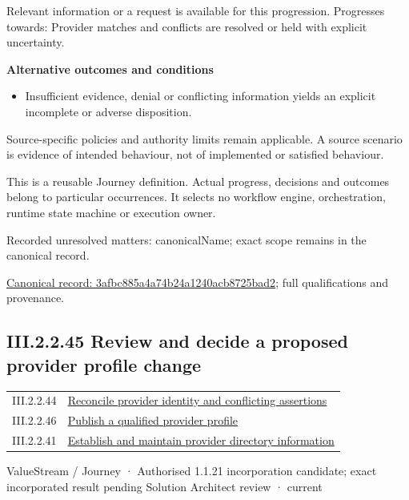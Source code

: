 Relevant information or a request is available for this progression. Progresses towards: Provider matches and conflicts are resolved or held with explicit uncertainty.



\par\medskip\textbf{Alternative outcomes and conditions}\par


\begin{itemize}


\item Insufficient evidence, denial or conflicting information yields an explicit incomplete or adverse disposition.

\end{itemize}


Source-specific policies and authority limits remain applicable. A source scenario is evidence of intended behaviour, not of implemented or satisfied behaviour.



This is a reusable Journey definition. Actual progress, decisions and outcomes belong to particular occurrences. It selects no workflow engine, orchestration, runtime state machine or execution owner.


{\small Recorded unresolved matters: canonicalName; exact scope remains in the canonical record.}\par
{\footnotesize \href{../../../../continuum/strategy/value-stream/3afbc885a4a74b24a1240acb8725bad2.md}{Canonical record: 3afbc885a4a74b24a1240acb8725bad2}; full qualifications and provenance.}\par
\subsection*{III.2.2.45 Review and decide a proposed provider profile change}
\label{navigation:III.2.2.45}

\begin{longtable}{p{.22\linewidth}p{.73\linewidth}}
III.2.2.44 & \hyperref[element:3afbc885a4a74b24a1240acb8725bad2]{Reconcile provider identity and conflicting assertions} \\
III.2.2.46 & \hyperref[element:4522e0c4204e4c0c93d2b1f9ef3887ad]{Publish a qualified provider profile} \\
III.2.2.41 & \hyperref[element:679b0055ee5d42d4a838e35edd3de01f]{Establish and maintain provider directory information} \\
\end{longtable}
\label{element:d8e20e81429945caa1508b50956475b5}
{\small ValueStream / Journey · Authorised 1.1.21 incorporation candidate; exact incorporated result pending Solution Architect review · current}\par

